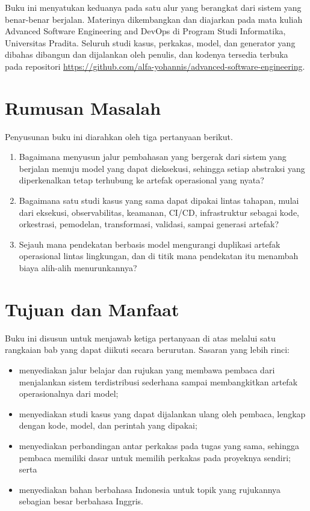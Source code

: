 Buku ini menyatukan keduanya pada satu alur yang berangkat dari sistem yang
benar-benar berjalan. Materinya dikembangkan dan diajarkan pada mata kuliah
Advanced Software Engineering and DevOps di Program Studi Informatika,
Universitas Pradita. Seluruh studi kasus, perkakas, model, dan generator yang
dibahas dibangun dan dijalankan oleh penulis, dan kodenya tersedia terbuka pada
repositori \url{https://github.com/alfa-yohannis/advanced-software-engineering}.

\section*{Rumusan Masalah}

Penyusunan buku ini diarahkan oleh tiga pertanyaan berikut.

\begin{enumerate}
  \item Bagaimana menyusun jalur pembahasan yang bergerak dari sistem yang
        berjalan menuju model yang dapat dieksekusi, sehingga setiap abstraksi
        yang diperkenalkan tetap terhubung ke artefak operasional yang nyata?
  \item Bagaimana satu studi kasus yang sama dapat dipakai lintas tahapan, mulai
        dari eksekusi, observabilitas, keamanan, CI/CD, infrastruktur sebagai
        kode, orkestrasi, pemodelan, transformasi, validasi, sampai generasi
        artefak?
  \item Sejauh mana pendekatan berbasis model mengurangi duplikasi artefak
        operasional lintas lingkungan, dan di titik mana pendekatan itu
        menambah biaya alih-alih menurunkannya?
\end{enumerate}

\section*{Tujuan dan Manfaat}

Buku ini disusun untuk menjawab ketiga pertanyaan di atas melalui satu rangkaian
bab yang dapat diikuti secara berurutan. Sasaran yang lebih rinci:

\begin{itemize}
  \item menyediakan jalur belajar dan rujukan yang membawa pembaca dari
        menjalankan sistem terdistribusi sederhana sampai membangkitkan artefak
        operasionalnya dari model;
  \item menyediakan studi kasus yang dapat dijalankan ulang oleh pembaca,
        lengkap dengan kode, model, dan perintah yang dipakai;
  \item menyediakan perbandingan antar perkakas pada tugas yang sama, sehingga
        pembaca memiliki dasar untuk memilih perkakas pada proyeknya sendiri;
        serta
  \item menyediakan bahan berbahasa Indonesia untuk topik yang rujukannya
        sebagian besar berbahasa Inggris.
\end{itemize}

